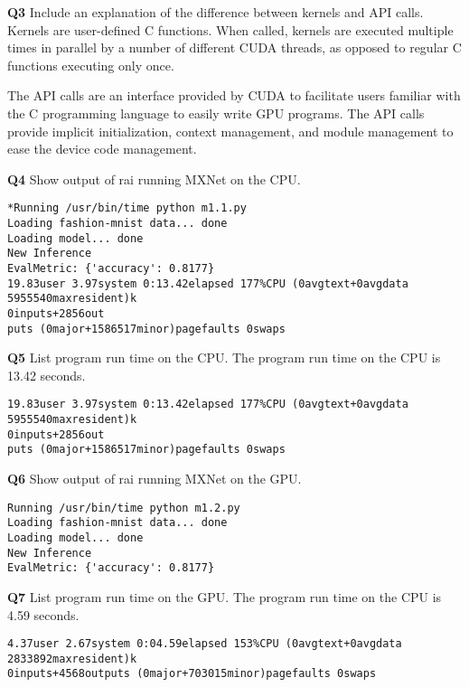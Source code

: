 \documentclass[11pt]{article}
\begin{document}
\textbf{Q3} Include an explanation of the difference between kernels and API calls.\\
Kernels are user-defined C functions. When called, kernels are executed multiple times in parallel by a number of different CUDA threads, as opposed to regular C functions executing only once.

The API calls are an interface provided by CUDA to facilitate users familiar with the C programming language to easily write GPU programs. The API calls provide implicit initialization, context management, and module management to ease the device code management.

\textbf{Q4} Show output of rai running MXNet on the CPU.
\begin{lstlisting}
*Running /usr/bin/time python m1.1.py
Loading fashion-mnist data... done
Loading model... done
New Inference
EvalMetric: {'accuracy': 0.8177}
19.83user 3.97system 0:13.42elapsed 177%CPU (0avgtext+0avgdata 5955540maxresident)k
0inputs+2856out
puts (0major+1586517minor)pagefaults 0swaps
\end{lstlisting}

\textbf{Q5} List program run time on the CPU.
The program run time on the CPU is 13.42 seconds.
\begin{lstlisting}
19.83user 3.97system 0:13.42elapsed 177%CPU (0avgtext+0avgdata 5955540maxresident)k
0inputs+2856out
puts (0major+1586517minor)pagefaults 0swaps
\end{lstlisting}

\textbf{Q6} Show output of rai running MXNet on the GPU.
\begin{lstlisting}
Running /usr/bin/time python m1.2.py
Loading fashion-mnist data... done
Loading model... done
New Inference
EvalMetric: {'accuracy': 0.8177}
\end{lstlisting}
 
\textbf{Q7} List program run time on the GPU.
The program run time on the CPU is 4.59 seconds.
\begin{lstlisting}
4.37user 2.67system 0:04.59elapsed 153%CPU (0avgtext+0avgdata 2833892maxresident)k
0inputs+4568outputs (0major+703015minor)pagefaults 0swaps
\end{lstlisting}
\end{document}
